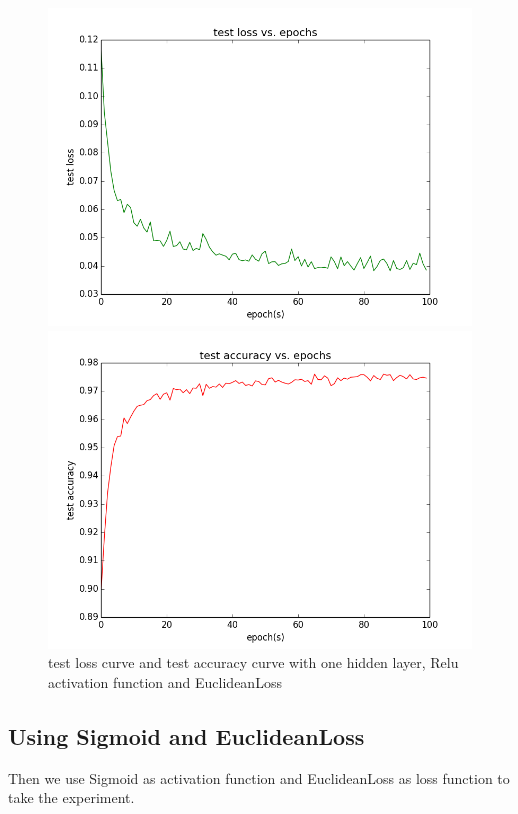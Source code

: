\documentclass{elegantbook}
\begin{document}
\begin{figure}[!ht]
	\centering
	\begin{minipage}[t]{0.45\textwidth}
		\centering
		\includegraphics[width=\textwidth]{testloss1re}
	\end{minipage}
	\begin{minipage}[t]{0.45\textwidth}
		\centering
		\includegraphics[width=\textwidth]{testacc1re}
	\end{minipage}
	\caption{\label{testcurve1}test loss curve and test accuracy curve with one hidden layer, Relu activation function and EuclideanLoss}
\end{figure}

\subsection{Using Sigmoid and EuclideanLoss}
Then we use Sigmoid as activation function and EuclideanLoss as loss function to take the experiment.
\end{document}
